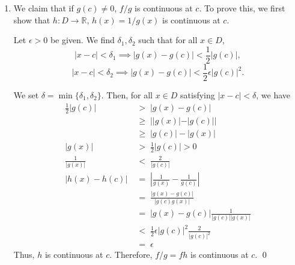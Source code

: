 \documentclass[10pt]{article}
\begin{document}
\begin{enumerate}
		We set $\delta = \min\{\delta_1, \delta_2, \delta_3, \delta_4\}$.
		Then, for all $x \in D$ satisfying $|x - c| < \delta$, we have
		\begin{align*}
			|(fg)(x) - (fg)(c)| \;&=\; |f(x)g(x) - f(c)g(c)| \\
			\;&=\; |(f(x) - f(c) + f(c))(g(x) - g(c) + g(c)) - f(c)g(c)| \\
			\;&=\; |(f(x) - f(c))(g(x) - g(c)) + f(c)(g(x) - g(c)) + g(c)(f(x) - f(c)) + f(c)g(c) - f(c)g(c)| \\
			\;&=\; |(f(x) - f(c))(g(x) - g(c)) + f(c)(g(x) - g(c)) + g(c)(f(x) - f(c))| \\
			\;&\le\; |f(x) - f(c)| |g(x) - g(c)| + |f(c)| |g(x) - g(c)| + |g(c)| |f(x) - f(c)| \\
			\;&<\; \sqrt\frac{\epsilon}{2} \sqrt\frac{\epsilon}{2} + \frac{|f(c)|\epsilon}{4(1 + |f(c|)} 
			+ \frac{|g(c)|\epsilon}{4(1 + |g(c|)} \\
			\;&<\; \frac{\epsilon}{2} + \frac{\epsilon}{4} + \frac{\epsilon}{4} \\
			\;&=\; \epsilon
		\end{align*}
		
		This proves our claim. \qed
		
		\item We claim that if $g(c) \neq 0$, $f /g$ is continuous at $c$.
		To prove this, we first show that $h\colon D \to \mathbb{R}$, $h(x) = 1/g(x)$ is
		continuous at $c$.
		
		Let $\epsilon > 0$ be given.
		We find $\delta_1, \delta_2$ such that for all $x \in D$,
		\[|x - c| < \delta_1 \implies |g(x) - g(c)| < \frac{1}{2}|g(c)|,\]
		\[|x - c| < \delta_2 \implies |g(x) - g(c)| < \frac{1}{2}\epsilon |g(c)|^2.\]
		
		We set $\delta = \min\{\delta_1, \delta_2\}$.
		Then, for all $x \in D$ satisfying $|x - c| < \delta$, we have
		\begin{align*}
			\frac{1}{2}|g(c)| \;&>\; |g(x) - g(c)| \\
			\;&\ge\; | |g(x)| - |g(c)| | \\
			\;&\ge\; |g(c)| - |g(x)| \\
			|g(x)| \;&>\; \frac{1}{2}|g(c)| > 0\\
			\frac{1}{|g(x)|} \;&<\; \frac{2}{|g(c)|} \\
			\left| h(x) - h(c) \right|
			\;&=\; \left| \frac{1}{g(x)} - \frac{1}{g(c)} \right| \\
			\;&=\; \frac{|g(x) - g(c)|}{|g(c)g(x)|} \\
			\;&=\; |g(x) - g(c)| \frac{1}{|g(c)| |g(x)|} \\
			\;&<\;  \frac{1}{2}\epsilon|g(c)|^2 \frac{2}{|g(c)|^2} \\
			\;&=\; \epsilon
		\end{align*}
		Thus, $h$ is continuous at $c$.
		Therefore, $f /g = fh$ is continuous at $c$. \qed
	\end{enumerate}
	
\end{document}
